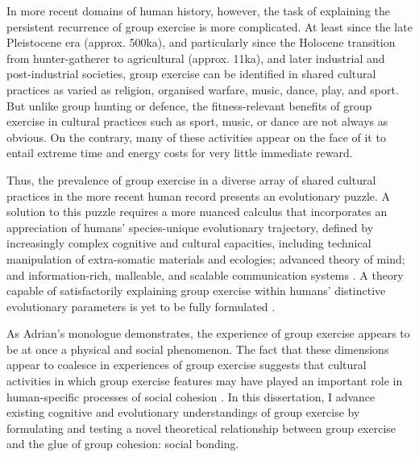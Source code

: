 \begin{CJK}{UTF8}{gbsn}
In more recent domains of human history, however, the task of explaining the persistent recurrence of group exercise is more complicated.  At least since the late Pleistocene era (approx. 500ka), and particularly since the Holocene transition from hunter-gatherer to agricultural (approx. 11ka), and later industrial and post-industrial societies, group exercise can be identified in shared cultural practices as varied as religion, organised warfare, music, dance, play, and sport.  But unlike group hunting or defence, the fitness-relevant benefits of group exercise in cultural practices such as sport, music, or dance are not always as obvious.  On the contrary, many of these activities appear on the face of it to entail extreme time and energy costs for very little immediate reward.

Thus, the prevalence of group exercise in a diverse array of shared cultural practices in the more recent human record presents an evolutionary puzzle.  A solution to this puzzle requires a more nuanced calculus that incorporates an appreciation of humans' species-unique evolutionary trajectory, defined by increasingly complex cognitive and cultural capacities, including technical manipulation of extra-somatic materials and ecologies; advanced theory of mind; and information-rich, malleable, and scalable communication systems \citep{Roepstorff2010,Clark2015,Fuentes2016}.  A theory capable of satisfactorily explaining group exercise within humans' distinctive evolutionary parameters is yet to be fully formulated \citep{Cohen2017}.

As Adrian's monologue demonstrates, the experience of group exercise appears to be at once a physical and social phenomenon.  The fact that these dimensions appear to coalesce in experiences of group exercise suggests that cultural activities in which group exercise features may have played an important role in human-specific processes of social cohesion \citep{Dunbar2010,Whitehouse2004,Cohen2017}.  In  this dissertation, I advance existing cognitive and evolutionary understandings of group exercise by formulating and testing a novel theoretical relationship between group exercise and the glue of group cohesion: social bonding.


\end{CJK}
